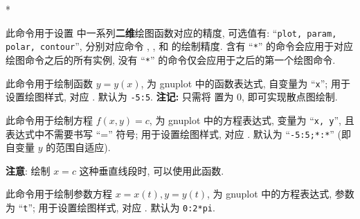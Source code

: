 \documentclass[
  hyper, 
  lang = cn, 
  class = l3doc,
  classOption={11pt},
  sect = {load=false},
]{../../zlatex/code/ztex}
\begin{document}
\begin{function}[added=2025-05-15]{\PlotPrecise}
  \begin{syntax}
    *
  \end{syntax}
  此命令用于设置  中一系列\textbf{二维}绘图函数对应的精度,  可选值有:
  ``\texttt{plot, param, polar, contour}'', 分别对应命令 , ,  和 
  的绘制精度. 含有 ``\texttt{*}'' 的命令会应用于对应绘图命令之后的所有实例, 没有 ``\texttt{*}'' 的命令仅会应用于之后的第一个绘图命令.
\end{function}



\begin{function}[added=2025-05-15]{\Plot}
  \begin{syntax}
  \end{syntax}
  此命令用于绘制函数 $y=y(x)$,  为 gnuplot 中的函数表达式, 自变量为 ``\texttt{x}'';
   用于设置绘图样式, 对应 . 
  默认为 \texttt{-5:5}. \textbf{注记:} 只需将  置为 0, 即可实现散点图绘制.
\end{function}


\begin{function}[added=2025-05-15]{\ContourPlot}
  \begin{syntax}
  \end{syntax}
  此命令用于绘制方程 $f(x, y)=c$,  为 gnuplot 中的方程表达式, 变量为 ``\texttt{x, y}'', 
  且表达式中不需要书写 ``='' 符号;  用于设置绘图样式, 对应 . 
  默认为 ``\texttt{-5:5;*:*}'' (即自变量 $y$ 的范围自适应).\par 
  \noindent\textbf{注意}: 绘制 $x=c$ 这种垂直线段时, 可以使用此函数.
\end{function}



\begin{function}[added=2025-05-15]{\ParamPlot}
  \begin{syntax}
  \end{syntax}
  此命令用于绘制参数方程 $x=x(t), y=y(t)$,  为 gnuplot 中的方程表达式, 参数为 ``\texttt{t}'';
   用于设置绘图样式, 对应 . 
  默认为 \texttt{0:2*pi}.
\end{function}
\end{document}
